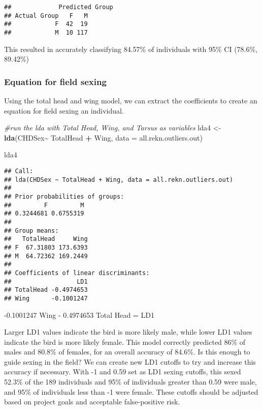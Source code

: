 \documentclass[
]{article}
\newenvironment{Shaded}{\begin{snugshade}}{\end{snugshade}}
\newcommand{\CommentTok}[1]{\textcolor[rgb]{0.56,0.35,0.01}{\textit{#1}}}
\newcommand{\DataTypeTok}[1]{\textcolor[rgb]{0.13,0.29,0.53}{#1}}
\newcommand{\KeywordTok}[1]{\textcolor[rgb]{0.13,0.29,0.53}{\textbf{#1}}}
\newcommand{\NormalTok}[1]{#1}
\newcommand{\OperatorTok}[1]{\textcolor[rgb]{0.81,0.36,0.00}{\textbf{#1}}}
\newcommand{\StringTok}[1]{\textcolor[rgb]{0.31,0.60,0.02}{#1}}
\begin{document}
\begin{verbatim}
##             Predicted Group
## Actual Group   F   M
##            F  42  19
##            M  10 117
\end{verbatim}

This resulted in accurately classifying 84.57\% of individuals with 95\%
CI (78.6\%, 89.42\%)

\hypertarget{equation-for-field-sexing}{%
\subsubsection{Equation for field
sexing}\label{equation-for-field-sexing}}

Using the total head and wing model, we can extract the coefficients to
create an equation for field sexing an individual.

\begin{Shaded}
\begin{Highlighting}[]
\CommentTok{\#run the lda with Total Head, Wing, and Tarsus as variables}
\NormalTok{lda4 \textless{}{-}}\StringTok{ }\KeywordTok{lda}\NormalTok{(CHDSex}\OperatorTok{\textasciitilde{}}\StringTok{ }\NormalTok{TotalHead }\OperatorTok{+}\StringTok{ }\NormalTok{Wing, }\DataTypeTok{data =}\NormalTok{ all.rekn.outliers.out)}

\NormalTok{lda4}
\end{Highlighting}
\end{Shaded}

\begin{verbatim}
## Call:
## lda(CHDSex ~ TotalHead + Wing, data = all.rekn.outliers.out)
## 
## Prior probabilities of groups:
##         F         M 
## 0.3244681 0.6755319 
## 
## Group means:
##   TotalHead     Wing
## F  67.31803 173.6393
## M  64.72362 169.2449
## 
## Coefficients of linear discriminants:
##                  LD1
## TotalHead -0.4974653
## Wing      -0.1001247
\end{verbatim}

-0.1001247 Wing - 0.4974653 Total Head = LD1

Larger LD1 values indicate the bird is more likely male, while lower LD1
values indicate the bird is more likely female. This model correctly
predicted 86\% of males and 80.8\% of females, for an overall accuracy
of 84.6\%. Is this enough to guide sexing in the field? We can create
new LD1 cutoffs to try and increase this accuracy if necessary. With -1
and 0.59 set as LD1 sexing cutoffs, this sexed 52.3\% of the 189
individuals and 95\% of individuals greater than 0.59 were male, and
95\% of individuals less than -1 were female. These cutoffs should be
adjusted based on project goals and acceptable false-positive risk.
\end{document}
